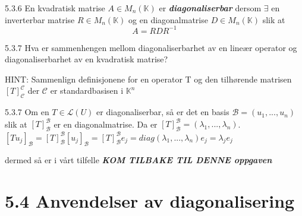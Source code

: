 \documentclass[a4paper,norsk]{article}
\begin{document}
\begin{definitionbox}{5.3.6}{}
En kvadratisk matrise $ A \in M_n (\mathbb{K}) $ er \textbf{\textit{diagonaliserbar}} dersom $ \exists $ en inverterbar matrise $ R \in M_n (\mathbb{K}) $ og en diagonalmatrise $ D \in M_n (\mathbb{K}) $ slik at 
\[
    A = RDR^{-1}
\]
\end{definitionbox}

\begin{oppgavebox}{5.3.7}{}
Hva er sammenhengen mellom diagonaliserbarhet av en lineær operator og diagonaliserbarhet av en kvadratisk matrise?

HINT: Sammenlign definisjonene for en operator T og den tilhørende matrisen $ \left[ T \right] _{ \mathcal{C}}^{ \mathcal{C}} $ der $ \mathcal{C} $ er standardbasisen i $ \mathbb{K}^n $ 

\begin{proofbox}{5.3.7}{}
Om en $ T \in \mathcal{L}(U) $ er diagonaliserbar, så er det en basis $ \mathcal{B} = \left( u_1, ..., u_n \right)  $ slik at $ \left[ T \right] _{ \mathcal{B}}^{ \mathcal{B}}  $ er en diagonalmatrise. Da er $ \left[ T \right] _{ \mathcal{B}}^{ \mathcal{B}} = \left( \lambda_1, ..., \lambda _n \right)  $. $ \left[ Tu_j \right] _{ \mathcal{B}} = \left[ T \right] _{ \mathcal{B}}^{ \mathcal{B}} \left[ u_j \right] _{ \mathcal{B}} = \left[ T \right] _{ \mathcal{B}}^{ \mathcal{B}} e_j = diag \left( \lambda _1, ..., \lambda _n \right) e_j  = \lambda _j e_j $ 

dermed så er i vårt tilfelle  \textbf{\textit{KOM TILBAKE TIL DENNE oppgaven}}
\end{proofbox}
\end{oppgavebox}


\section*{5.4 Anvendelser av diagonalisering}
\end{document}
